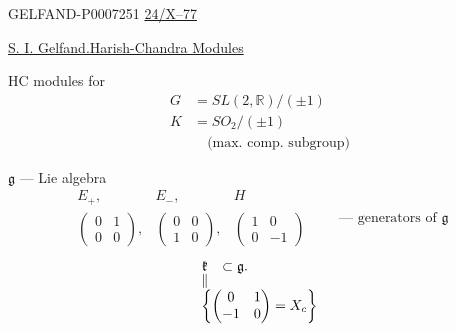 \begin{GelfandAdjacentEvidence}{GELFAND-P000725}{1}
\underline{24/X--77}

\underline{S. I. Gelfand.}\qquad\underline{Harish-Chandra Modules}

HC modules for
\[
\begin{aligned}
G&=SL(2,\mathbb R)/(\pm1)\\
K&=SO_2/(\pm1)\\[-.25ex]
 &\quad\text{(max. comp. subgroup)}
\end{aligned}
\]

\(\mathfrak g\) --- Lie algebra
\[
\begin{array}{ccc}
E_+,&E_-,&H\\[.4ex]
\begin{pmatrix}0&1\\0&0\end{pmatrix},&
\begin{pmatrix}0&0\\1&0\end{pmatrix},&
\begin{pmatrix}1&0\\0&-1\end{pmatrix}
\end{array}
\qquad\text{--- generators of }\mathfrak g
\]
\[
\begin{array}{cl}
\mathfrak k&\subset\mathfrak g.\\[-.5ex]
\Vert&\\
\multicolumn{2}{l}{\left\{\begin{pmatrix}0&1\\-1&0\end{pmatrix}=X_c\right\}}
\end{array}
\]
\end{GelfandAdjacentEvidence}



